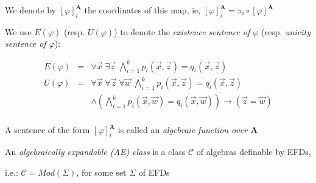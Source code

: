 \documentclass[12pt,handout]{beamer}
\begin{document}
\begin{frame}

We denote by $[\varphi]^{\mathbf{A}}_i$ the coordinates of this map, ie, $[\varphi]^{\mathbf{A}}_i = \pi_i \circ [\varphi]^{\mathbf{A}}$

\bigskip

We use $E(\varphi)$ (resp. $U(\varphi)$) to denote the \textit{existence sentence of $\varphi$} (resp. \textit{unicity sentence of $\varphi$}):

\[
\begin{array}{rcl}
E(\varphi) & = & \forall \vec{x} \; \exists \vec{z}\;\bigwedge_{i=1}^{k}p_{i}(\vec{x},\vec{z})=q_{i}(\vec{x},\vec{z})\\
U(\varphi) & = & \forall \vec{x} \; \forall \vec{z} \; \forall \vec{w}\;
\bigwedge_{i=1}^{k}p_{i}(\vec{x},\vec{z})=q_{i}(\vec{x},\vec{z}) \\ 
& & \wedge (\bigwedge_{i=1}^{k}p_{i}(\vec{x},\vec{w})=q_{i}(\vec{x},\vec{w})) \rightarrow  (\vec{z} = \vec{w})\\
\end{array}
\]

\end{frame}

\begin{frame}

\begin{definition}

\bigskip

A sentence of the form $[\varphi]_{i}^\mathbf{A}$ is called an \textit{algebraic function over $\mathbf{A}$}

\pause

\bigskip

An \textit{algebraically expandable (AE) class} is a class $\mathcal{C}$ of algebras definable by EFDs, 

\bigskip
\pause

i.e.: $\mathcal{C}=Mod(\Sigma )$, for some set $\Sigma$ of EFDs  

\end{definition}

\end{frame}
\end{document}
